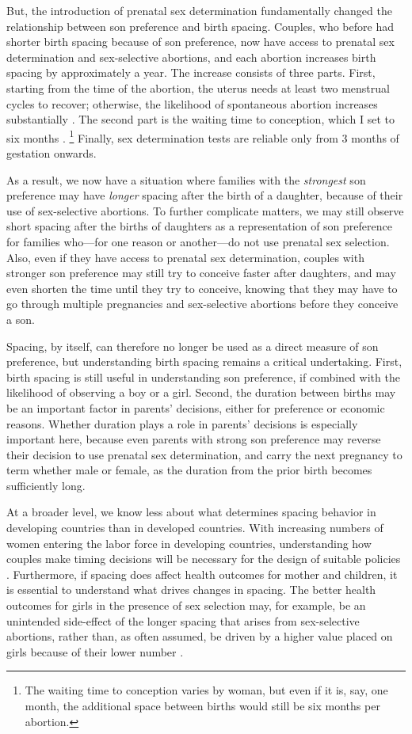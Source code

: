 \documentclass[12pt,letterpaper]{article}
\begin{document}
But, the introduction of prenatal sex determination fundamentally changed the 
relationship between son preference and birth spacing.
Couples, who before had shorter birth spacing because of son preference,
now have access to prenatal sex determination and sex-selective abortions,
and each abortion increases birth spacing by approximately a year.
The increase consists of three parts.
First, starting from the time of the abortion, the uterus needs at 
least two menstrual cycles to recover;  otherwise, the likelihood 
of spontaneous abortion increases substantially \citep{zhou00b}.
The second part is the waiting time to conception, which I set to six 
months \citep{Wang2003}.%
\footnote{
The waiting time to conception varies by woman, but even if it is, say, one 
month, the additional space between births would still be six months per abortion.
}
Finally, sex determination tests are reliable only from 3 months 
of gestation onwards.

As a result, we now have a situation where families with the 
\emph{strongest} son preference may have \emph{longer} spacing after 
the birth of a daughter,
because of their use of sex-selective abortions.
To further complicate matters, we may still observe short spacing 
after the births of daughters as a representation of son preference for 
families who---for one reason or another---do not use prenatal sex selection.
Also, even if they have access to prenatal sex determination, couples 
with stronger son preference may still try to conceive faster after daughters, 
and may even shorten the time until they try to conceive, knowing that 
they may have to go through multiple pregnancies and sex-selective
abortions before they conceive a son.

Spacing, by itself, can therefore no longer be used as a direct measure of 
son preference, but understanding birth spacing remains a critical undertaking.
First, birth spacing is still useful in understanding son preference, 
if combined with the likelihood of observing a boy or a girl.
Second, 
the duration between births may be an important factor in parents' 
decisions, either for preference or economic reasons.
Whether duration plays a role in parents' decisions is especially important 
here, because even parents with strong son preference may reverse their 
decision to use prenatal sex determination, and carry the next pregnancy 
to term whether male or female, as the duration from the prior birth 
becomes sufficiently long.

At a broader level, we know less about what determines spacing behavior in 
developing countries than in developed countries.
With increasing numbers of women entering the labor force in developing
countries, understanding how couples make timing decisions will be necessary
for the design of suitable policies \citep{Portner2018}.
Furthermore, if spacing does affect health outcomes for mother and children, it is 
essential to understand what drives changes in spacing.
The better health outcomes for girls in the presence of sex selection may,
for example, be an unintended side-effect of the longer spacing that arises
from sex-selective abortions, rather than, as often assumed, be driven by a 
higher value placed on girls because of their lower number \citep{Lin2014,Hu2015}.
\end{document}

